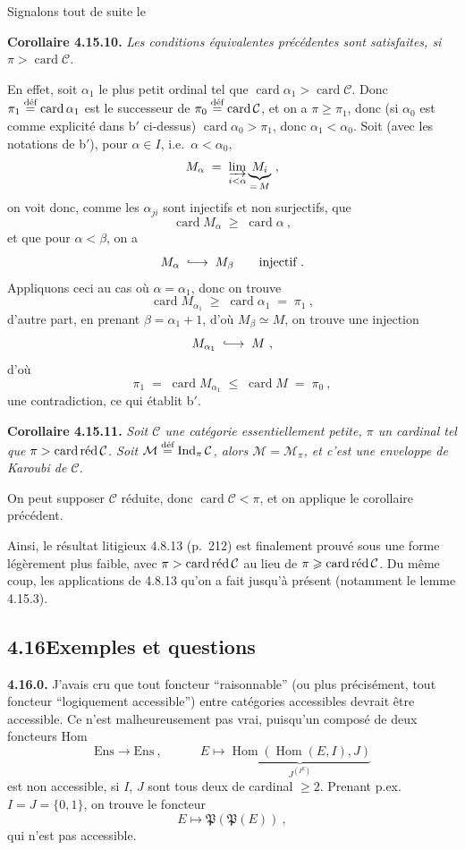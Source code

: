 \documentclass[11pt]{article}
\newcommand{\printedpage}[1]{\marginpar{\footnotesize p.~#1}}
\newcommand{\msp}[1]{\marginpar{\footnotesize [#1]}}
\newcommand{\Hom}{\operatorname{Hom}}
\newcommand{\Ind}{\operatorname{Ind}}
\newcommand{\Ens}{\mathrm{Ens}}
\newcommand{\card}{\operatorname{card}}
\newcommand{\defeq}{\overset{\text{\upshape déf}}{=}}
\newcommand{\redop}{\mathop{\textnormal{réd}}\nolimits}
\newcommand{\into}{\lhook\joinrel\longrightarrow}
\begin{document}
\printedpage{179}

Signalons tout de suite le

\textbf{Corollaire 4.15.10.} \textit{Les conditions équivalentes précédentes sont satisfaites, si $\pi > \card\mathcal{C}$.}

En effet, soit $\alpha_1$ le plus petit ordinal tel que $\card\alpha_1 > \card\mathcal{C}$. Donc $\pi_1 \defeq \card\alpha_1$ est le successeur de $\pi_0 \defeq \card\mathcal{C}$, et on a $\pi \geqslant \pi_1$, donc (si $\alpha_0$ est comme explicité dans b$'$ ci-dessus) $\card\alpha_0 > \pi_1$, donc $\alpha_1 < \alpha_0$. Soit (avec les notations de b$'$), pour $\alpha \in I$, i.e.\ $\alpha < \alpha_0$,
\[
M_\alpha \;=\; \varinjlim_{i<\alpha} \underbrace{M_i}_{=\,M}\ ,
\]
on voit donc, comme les $\alpha_{ji}$ sont injectifs et non surjectifs, que
\[
\card M_\alpha \;\geqslant\; \card\alpha\ ,
\]
\msp{463}
et que pour $\alpha < \beta$, on a
\[
M_\alpha \;\into\; M_\beta \qquad \text{injectif}\ .
\]
Appliquons ceci au cas où $\alpha = \alpha_1$, donc on trouve
\[
\card M_{\alpha_1} \;\geqslant\; \card\alpha_1 \;=\; \pi_1\ ,
\]
d'autre part, en prenant $\beta = \alpha_1 + 1$, d'où $M_\beta \simeq M$, on trouve une injection
\[
M_{\alpha_1} \;\into\; M\ ,
\]
d'où
\[
\pi_1 \;=\; \card M_{\alpha_1} \;\leqslant\; \card M \;=\; \pi_0\ ,
\]
une contradiction, ce qui établit b$'$.

\textbf{Corollaire 4.15.11.} \textit{Soit $\mathcal{C}$ une catégorie essentiellement petite, $\pi$ un cardinal tel que $\pi > \card\redop\mathcal{C}$. Soit $\mathcal{M} \defeq \Ind_\pi\mathcal{C}$, alors $\mathcal{M} = \mathcal{M}_\pi$, et c'est une enveloppe de Karoubi de $\mathcal{C}$.}

On peut supposer $\mathcal{C}$ réduite, donc $\card\mathcal{C} < \pi$, et on applique le corollaire précédent.

Ainsi, le résultat litigieux 4.8.13 (p.~212) est finalement prouvé sous une forme légèrement plus faible, avec $\pi > \card\redop\mathcal{C}$ au lieu de $\pi \geqslant \card\redop\mathcal{C}$. Du même coup, les applications de 4.8.13 qu'on a fait jusqu'à présent (notamment le lemme 4.15.3).

\msp{464}

\subsection*{4.16\quad Exemples et questions}

\textbf{4.16.0.} J'avais cru que tout foncteur “raisonnable” (ou plus précisément, tout foncteur “logiquement accessible”) entre catégories accessibles devrait être accessible. Ce n'est malheureusement pas vrai, puisqu'un composé de deux foncteurs Hom
\[
\Ens \longrightarrow \Ens\ , \qquad\quad E \longmapsto \underbrace{\Hom(\Hom(E,I),J)}_{J^{(I^E)}}
\]
\printedpage{180}
est non accessible, si $I$, $J$ sont tous deux de cardinal $\geqslant 2$. Prenant p.ex.\ $I = J = \{0,1\}$, on trouve le foncteur
\[
E \longmapsto \mathfrak{P}(\mathfrak{P}(E))\ ,
\]
qui n'est pas accessible.
\end{document}

